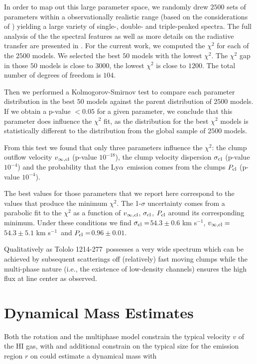 \documentclass[a4paper, usenatbib, 12pt]{article}
\newcommand{\tol}{Tololo 1214-277}
\newcommand{\lya}{Ly$\alpha$}
\newcommand{\sigmaclump}{$54.3\pm 0.6$ km s$^{-1}$}
\newcommand{\inftyclump}{$54.3\pm 5.1$ km s$^{-1}$}
\newcommand{\probaclump}{$0.96\pm 0.01$}
\begin{document}
{In order to map out this large parameter space, we randomly drew
$2500$ sets of parameters within a observationally realistic range
(based on the considerations of \cite{Laursen2013ApJ...766..124L})
yielding a large variety of single-, double- and triple-peaked
spectra. 
The full analysis of the the spectral features as well as
more details on the radiative transfer are presented in
\cite{Gronke2016}.    
 For the current work, we computed the $\chi^2$ for each of the $2500$
models. We selected the best $50$ models with the lowest $\chi^2$. The
$\chi^2$ gap in those $50$ models is close to $3000$, the lowest
$\chi^2$ is close to $1200$. The total number of degrees of freedom is
$104$.    

Then we performed a Kolmogorov-Smirnov test to compare each parameter
distribution in the best $50$ models against the parent distribution
of $2500$ models. 
If we obtain a p-value $<0.05$ for a given parameter, we conclude that
this parameter does influence the $\chi^2$ fit, as the distribution for
the best $\chi^2$ models is statistically different to the
distribution from the global sample of $2500$ models.  

From this test we found that only three parameters influence the
$\chi^2$: the clump outflow velocity $v_{\infty,\rm{cl}}$ (p-value 
$10^{-18}$), the clump velocity dispersion $\sigma_{\rm cl}$ (p-value
$10^{-4}$) and the probability that the \lya\ emission comes from the
clumps $P_{\rm cl}$ (p-value $10^{-4}$).

The best values for those parameters that we report here correspond to
the values that produce the minimum
$\chi^2$. The 1-$\sigma$ uncertainty comes from a parabolic fit to the
$\chi^2$ as a function of $v_{\infty,\rm{cl}}$, $\sigma_{\rm cl}$,
$P_{\rm cl}$ around its corresponding minimum.
Under these conditions we find $\sigma_{\rm cl}=$\sigmaclump,
$v_{\infty {\rm, cl}}=$\inftyclump\ and $P_{\rm cl}=$\probaclump. 

Qualitatively as \tol\ possesses a very wide spectrum which can be
achieved by subsequent scatterings off (relatively) fast moving clumps
while the multi-phase nature (i.e., the existence of low-density
channels) ensures the high flux at line center as observed.     


\section*{Dynamical Mass Estimates}

Both the rotation and the multiphase model constrain the typical
velocity $v$ of the HI gas, with and additional constrain on the typical
size for the emission region $r$ on could estimate a dynamical mass with 

}
\end{document}
